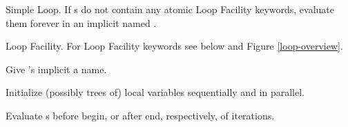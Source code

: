 \begin{LIST}{1cm}

  {
  Simple Loop. If s do not contain any atomic Loop Facility
  keywords, evaluate them forever in an implicit  named \NIL.
  }

  {
  Loop Facility. For Loop Facility keywords
  see below and Figure \ref{loop-overview}.
  }

  \begin{LIST}{.5cm}
    
    {
    Give 's implicit  a name.
    }

    {
    Initialize (possibly trees of) local variables 
    sequentially and  in parallel. 
    }

    {
    Evaluate s before begin, or after end, respectively, of iterations.
    }


\end{LIST}
\end{LIST}
